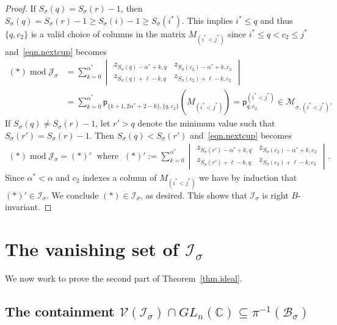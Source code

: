 \documentclass[11pt]{amsart}
\theoremstyle{remark}
\theoremstyle{remark}
\theoremstyle{definition}
\theoremstyle{definition}
\theoremstyle{definition}
\numberwithin{equation}{section}
\newcommand{\C}{\mathbb{C}}           %
\newcommand{\gs}{\sigma}
\newcommand{\cb}{\mathcal{B}}
\newcommand{\ci}{\mathcal{I}}
\newcommand{\cj}{\mathcal{J}}
\newcommand{\cm}{\mathcal{M}}
\newcommand{\cv}{\mathcal{V}}
\newcommand{\al}{\alpha}
\newcommand{\pl}{\mathsf{p}}
\begin{document}
\begin{proof}
If $S_\gs(q)=S_\gs(r)-1$, then $S_\gs(q) = S_{\gs}(r)-1 \geq S_{\gs}(i)-1 \geq  S_{\gs}(i^*)$. This implies $i^*\leq q$ and thus $\{q,c_2\}$ is a valid choice of columns in the matrix $M_{(i^*<j^*)}$ since $i^*\leq q < c_2\leq j^*$ and~\eqref{eqn.nextcup} becomes
\begin{align*}
(*)\; \mathrm{mod}\; \cj_\gs &= \sum_{k=0}^{\al^*} \begin{vmatrix}
z_{S_\gs(q)-\al^*+k, q}&z_{S_\sigma(c_2)-\al^*+k, c_2}\\
z_{S_\gs(q)+\ell-k, q} &  z_{S_\gs(c_2)+\ell-k, c_2}
\end{vmatrix}\\ &= \sum_{k=0}^{\al^*} \pl_{\{k+1, 2\al^* +2-k\},\{q,c_2\}} (M_{(i^*<j^*)}) = \pl_{q,c_2}^{(i^*<j^*)} \in \cm_{\gs,(i^*<j^*)}.
\end{align*}
If $S_\gs(q)\neq S_\gs(r)-1$, let $r'>q$ denote the minimum value such that $S_\gs(r') = S_\gs(r)-1$. Then $S_\gs(q)<S_\gs(r')$ and~\eqref{eqn.nextcup} becomes
\begin{align*}
(*)\; \mathrm{mod}\; \cj_\gs = (*)' \; \text{ where } \;  (*)' := \sum_{k=0}^{\alpha^*} \begin{vmatrix}
z_{S_\gs(r')-\al^*+k, q}&z_{S_\sigma(c_2)-\al^*+k, c_2}\\
z_{S_\gs(r')+\ell-k, q} &  z_{S_\gs(c_2)+\ell-k, c_2}
\end{vmatrix} .
\end{align*}
Since $\al^* < \al$ and $c_2$ indexes a column of $M_{(i^*<j^*)}$ we have by induction that $(*)'\in \ci_\gs$.   We conclude $(*)\in \ci_\gs$, as desired. This shows that $\ci_\gs$ is right $B$-invariant.
\end{proof}






\section{The vanishing set of \texorpdfstring{$\ci_\gs$}{ci	extunderscore gs}}\label{sec.vanishingset}

We now work to prove the second part of Theorem~\ref{thm.ideal}.

\subsection{The containment $\cv(\ci_\gs) \cap GL_n(\C) \subseteq \pi^{-1}(\cb_\gs)$}
\end{document}
